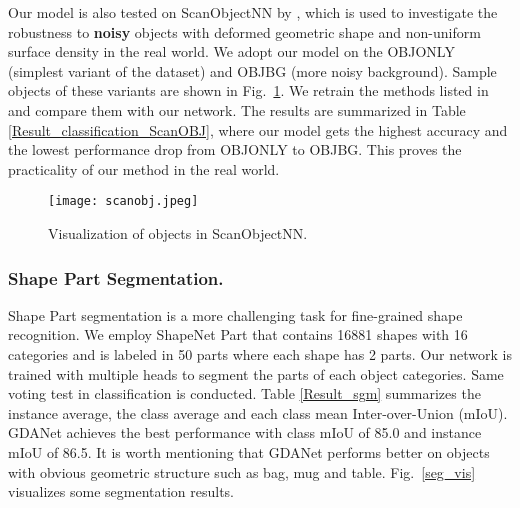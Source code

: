 \documentclass[letterpaper]{article} \usepackage{aaai21}  \usepackage{times}  \usepackage{helvet} \usepackage{courier}  \usepackage[hyphens]{url}  \usepackage{graphicx} \urlstyle{rm} \def\UrlFont{\rm}  \usepackage{natbib}  \usepackage{caption} \frenchspacing  \setlength{\pdfpagewidth}{8.5in}  \setlength{\pdfpageheight}{11in}  \usepackage{color}
\begin{document}
Our model is also tested on ScanObjectNN by \cite{Uy_2019_ICCVnew}, which is used to investigate the robustness to \textbf{noisy} objects with deformed geometric shape and non-uniform surface density in the real world. We adopt our model on the OBJONLY (simplest variant of the dataset) and OBJBG (more noisy background). Sample objects of these variants are shown in Fig.~\ref{scanobj}. We retrain the methods listed in \cite{Uy_2019_ICCVnew} and compare them with our network. The results are summarized in Table \ref{Result_classification_ScanOBJ}, where our model gets the highest accuracy and the lowest performance drop from OBJONLY to OBJBG. This proves the practicality of our method in the real world.
\begin{figure}[t]
\setlength{\abovecaptionskip}{0cm} 
	\begin{center}
    \texttt{[image: scanobj.jpeg]}
    \end{center}
	\caption{Visualization of objects in ScanObjectNN.}
	\label{scanobj}
\end{figure}

\begin{table}[t]
	\centering
	\caption{Classification results (\%) on ScanObjectNN dataset (noise robustness test).}
    \label{Result_classification_ScanOBJ}
\end{table}



\subsubsection{Shape Part Segmentation.}
Shape Part segmentation is a more challenging task for fine-grained shape recognition. We employ ShapeNet Part \cite{Yi:2016:SAF:2980179.2980238} that contains 16881 shapes with 16 categories and is labeled in 50 parts where each shape has 2 parts. Our network is trained with multiple heads to segment the parts of each object categories. Same voting test in classification is conducted. Table \ref{Result_sgm} summarizes the instance average, the class average and each class mean Inter-over-Union (mIoU). GDANet achieves the best performance with class mIoU of 85.0 and instance mIoU of 86.5. It is worth mentioning that GDANet performs better on objects with obvious geometric structure such as bag, mug and table. Fig.~\ref{seg_vis} visualizes some segmentation results.
\end{document}
